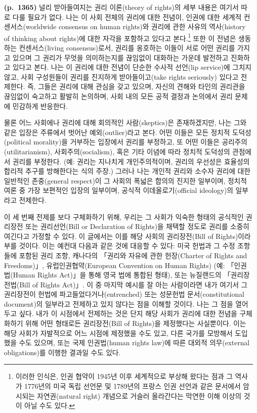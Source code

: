 \documentclass[a4paper,12pt,oneside]{article}  %
\begin{document}
\textbf{(p.~1365)} 널리 받아들여지는 권리 이론(theory of rights)의 세부
내용은 여기서 따로 다룰 필요가 없다. 나는 이 사회 전체의 권리에 대한
전념이, 인권에 대한 세계적 컨센서스(worldwide consensus on human
rights)와 권리에 관한 사유의 역사(history of thinking about rights)에
대한 자각을 포함하고 있다고 본다.\footnote{이러한 인식은, 인권 협약이
  1945년 이후 세계적으로 부상해 왔다는 점과 그 역사가 1776년의 미국 독립
  선언문 및 1789년의 프랑스 인권 선언과 같은 문서에서 암시되는
  자연권(natural right) 개념으로 거슬러 올라간다는 막연한 이해 이상의
  것이 아닐 수도 있다.} 또한 이 전념은 생동하는 컨센서스(living
consensus)로서, 권리를 옹호하는 이들이 서로 어떤 권리를 가지고 있으며 그
권리가 무엇을 의미하는지를 끊임없이 대화하는 가운데 발전하고 진화하고
있다고 본다. 나는 이 권리에 대한 전념이 단순한 수사적 선언(lip
service)에 그치지 않고, 사회 구성원들이 권리를 진지하게 받아들이고(take
rights seriously) 있다고 전제한다. 즉, 그들은 권리에 대해 관심을 갖고
있으며, 자신의 견해와 타인의 권리관을 끊임없이 숙고하고 활발히 논의하며,
사회 내의 모든 공적 결정과 논의에서 권리 문제에 민감하게 반응한다.

물론 어느 사회에나 권리에 대해 회의적인 사람(skeptics)은 존재하겠지만,
나는 그와 같은 입장은 주류에서 벗어난 예외(outlier)라고 본다. 어떤
이들은 모든 정치적 도덕성(political morality)을 거부하는 입장에서 권리를
부정하고, 또 어떤 이들은 공리주의(utilitarianism), 사회주의(socialism),
혹은 기타 이념에 따라 정치적 도덕성의 관점에서 권리를 부정한다. (예:
권리는 지나치게 개인주의적이며, 권리의 우선성은 효율성의 합리적 추구를
방해한다는 식의 주장.) 그러나 나는 개인적 권리와 소수자 권리에 대한
일반적인 존중(general respect)이 그 사회의 폭넓은 합의의 진지한
일부이며, 정치적 여론 중 가장 보편적인 입장의 일부이며, 공식적
이데올로기(official ideology)의 일부라고 전제한다.

이 세 번째 전제를 보다 구체화하기 위해, 우리는 그 사회가 익숙한 형태의
공식적인 권리장전 또는 권리선언(Bill or Declaration of Rights)을 채택할
정도로 권리를 소중히 여긴다고 가정할 수 있다. 이 글에서는 이를 해당
사회의 권리장전(Bill of Rights)이라 부를 것이다. 이는 예컨대 다음과 같은
것에 대응할 수 있다: 미국 헌법과 그 수정 조항들에 포함된 권리 조항,
캐나다의 「권리와 자유에 관한 헌장(Charter of Rights and Freedoms)」,
유럽인권협약(European Convention on Human Rights) (예: 「인권법(Human
Rights Act)」을 통해 영국 법에 통합된 형태), 또는 뉴질랜드의
「권리장전법(Bill of Rights Act)」. 이 중 마지막 예시를 잘 아는
사람이라면 내가 여기서 그 권리장전이 헌법에 파고들었다거나(entrenched)
또는 성문헌법 문서(constitutional document)의 일부라고 전제하고 있지
않다는 점을 이해할 것이다. 나는 그 점을 열어 두고 싶다. 내가 이 시점에서
전제하는 것은 단지 해당 사회가 권리에 대한 전념을 구체화하기 위해 어떤
형태로든 권리장전(Bill of Rights)을 제정했다는 사실뿐이다. 이는 해당
사회가 자발적으로 어느 시점에 제정했을 수도 있고, 다른 국가를 모방해서
도입했을 수도 있으며, 또는 국제 인권법(human rights law)에 따른 대외적
의무(external obligations)를 이행한 결과일 수도 있다.
\end{document}
